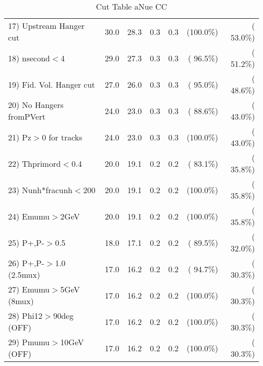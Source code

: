 \begin{table}[h!]
\begin{tabular}{||l||r|r|r|r|r|r||}
 17) Upstream Hanger cut  &         30.0 &         28.3 &          0.3 &          0.3 & (100.0\%) & ( 53.0\%) \\
 18) nsecond$<$4          &         29.0 &         27.3 &          0.3 &          0.3 & ( 96.5\%) & ( 51.2\%) \\
 19) Fid. Vol. Hanger cut &         27.0 &         26.0 &          0.3 &          0.3 & ( 95.0\%) & ( 48.6\%) \\
 20) No Hangers fromPVert &         24.0 &         23.0 &          0.3 &          0.3 & ( 88.6\%) & ( 43.0\%) \\
 21) Pz$>$0 for tracks    &         24.0 &         23.0 &          0.3 &          0.3 & (100.0\%) & ( 43.0\%) \\
 22) Thprimord$<$0.4      &         20.0 &         19.1 &          0.2 &          0.2 & ( 83.1\%) & ( 35.8\%) \\
 23) Nunh*fracunh$<$200   &         20.0 &         19.1 &          0.2 &          0.2 & (100.0\%) & ( 35.8\%) \\
 24) Emumu$>$2GeV         &         20.0 &         19.1 &          0.2 &          0.2 & (100.0\%) & ( 35.8\%) \\
 25) P+,P-$>$0.5          &         18.0 &         17.1 &          0.2 &          0.2 & ( 89.5\%) & ( 32.0\%) \\
 26) P+,P-$>$1.0 (2.5mux) &         17.0 &         16.2 &          0.2 &          0.2 & ( 94.7\%) & ( 30.3\%) \\
 27) Emumu$>$5GeV  (8mux) &         17.0 &         16.2 &          0.2 &          0.2 & (100.0\%) & ( 30.3\%) \\
 28) Phi12$>$90deg  (OFF) &         17.0 &         16.2 &          0.2 &          0.2 & (100.0\%) & ( 30.3\%) \\
 29) Pmumu$>$10GeV  (OFF) &         17.0 &         16.2 &          0.2 &          0.2 & (100.0\%) & ( 30.3\%) \\
 \hline
 \hline
 \end{tabular}
 \caption{Cut Table  aNue CC  }
 \label{tab-cutcohjpsi-mumu_anuecc}
 \end{table}
